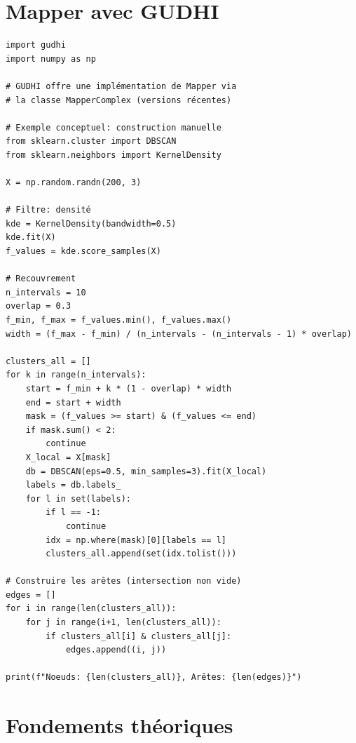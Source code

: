 \section{Mapper avec GUDHI}

\begin{codeblock}[title=\textbf{Mapper avec GUDHI}]
\begin{verbatim}
import gudhi
import numpy as np

# GUDHI offre une implémentation de Mapper via
# la classe MapperComplex (versions récentes)

# Exemple conceptuel: construction manuelle
from sklearn.cluster import DBSCAN
from sklearn.neighbors import KernelDensity

X = np.random.randn(200, 3)

# Filtre: densité
kde = KernelDensity(bandwidth=0.5)
kde.fit(X)
f_values = kde.score_samples(X)

# Recouvrement
n_intervals = 10
overlap = 0.3
f_min, f_max = f_values.min(), f_values.max()
width = (f_max - f_min) / (n_intervals - (n_intervals - 1) * overlap)

clusters_all = []
for k in range(n_intervals):
    start = f_min + k * (1 - overlap) * width
    end = start + width
    mask = (f_values >= start) & (f_values <= end)
    if mask.sum() < 2:
        continue
    X_local = X[mask]
    db = DBSCAN(eps=0.5, min_samples=3).fit(X_local)
    labels = db.labels_
    for l in set(labels):
        if l == -1:
            continue
        idx = np.where(mask)[0][labels == l]
        clusters_all.append(set(idx.tolist()))

# Construire les arêtes (intersection non vide)
edges = []
for i in range(len(clusters_all)):
    for j in range(i+1, len(clusters_all)):
        if clusters_all[i] & clusters_all[j]:
            edges.append((i, j))

print(f"Noeuds: {len(clusters_all)}, Arêtes: {len(edges)}")
\end{verbatim}
\end{codeblock}

\section{Fondements th\'eoriques}

